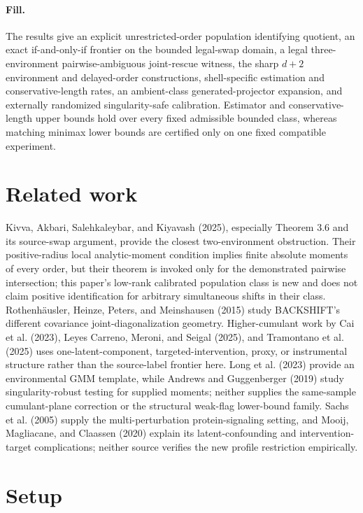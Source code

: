 \documentclass{article}
\begin{document}
\paragraph{Fill.} The results give an explicit unrestricted-order population identifying quotient, an exact if-and-only-if frontier on the bounded legal-swap domain, a legal three-environment pairwise-ambiguous joint-rescue witness, the sharp \(d+2\) environment and delayed-order constructions, shell-specific estimation and conservative-length rates, an ambient-class generated-projector expansion, and externally randomized singularity-safe calibration.  Estimator and conservative-length upper bounds hold over every fixed admissible bounded class, whereas matching minimax lower bounds are certified only on one fixed compatible experiment.

\section{Related work}

Kivva, Akbari, Salehkaleybar, and Kiyavash (2025), especially Theorem 3.6 and its source-swap argument, provide the closest two-environment obstruction.  Their positive-radius local analytic-moment condition implies finite absolute moments of every order, but their theorem is invoked only for the demonstrated pairwise intersection; this paper's low-rank calibrated population class is new and does not claim positive identification for arbitrary simultaneous shifts in their class.  Rothenhäusler, Heinze, Peters, and Meinshausen (2015) study BACKSHIFT's different covariance joint-diagonalization geometry.  Higher-cumulant work by Cai et al. (2023), Leyes Carreno, Meroni, and Seigal (2025), and Tramontano et al. (2025) uses one-latent-component, targeted-intervention, proxy, or instrumental structure rather than the source-label frontier here.  Long et al. (2023) provide an environmental GMM template, while Andrews and Guggenberger (2019) study singularity-robust testing for supplied moments; neither supplies the same-sample cumulant-plane correction or the structural weak-flag lower-bound family.  Sachs et al. (2005) supply the multi-perturbation protein-signaling setting, and Mooij, Magliacane, and Claassen (2020) explain its latent-confounding and intervention-target complications; neither source verifies the new profile restriction empirically.

\section{Setup}
\end{document}
